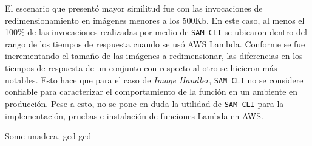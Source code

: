 El escenario que presentó mayor similitud fue con las invocaciones de redimensionamiento en imágenes menores a los 500Kb. En este caso, al menos el 100\% de las invocaciones realizadas por medio de \texttt{SAM CLI} se ubicaron dentro del rango de los tiempos de respuesta cuando se usó AWS Lambda. Conforme se fue incrementando el tamaño de las imágenes a redimensionar, las diferencias en los tiempos de respuesta de un conjunto con respecto al otro se hicieron más notables. Esto hace que para el caso de \emph{Image Handler}, \texttt{SAM CLI} no se considere confiable para caracterizar el comportamiento de la función en un ambiente en producción. Pese a esto, no se pone en duda la utilidad de \texttt{SAM CLI} para la implementación, pruebas e instalación de funciones Lambda en AWS.

Some \gls{unadeca}, \acrlong{gcd} \acrshort{gcd}


